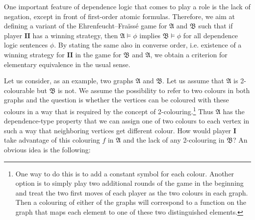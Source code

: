 \documentclass[12pt]{article}
\theoremstyle{definition}
\newcommand{\playerone}{\mathrm{\mathbf{I}}}
\newcommand{\playertwo}{\mathrm{\mathbf{II}}}
\newcommand{\A}{\mathfrak{A}}
\newcommand{\B}{\mathfrak{B}}
\def\ma{\A}
\def\mb{\B}
\begin{document}
One important feature of dependence logic that comes to play a role is the lack of negation, except in front of first-order atomic formulas. Therefore, we aim at defining a variant of the Ehrenfeucht--Fraïssé game for $\ma$ and $\mb$ such that if player $\playertwo$ has a winning strategy, then $\ma\models\phi$ implies $\mb\models\phi$ for all dependence logic sentences $\phi$. By stating the same also in converse order, i.e. existence of a winning strategy for $\playertwo$ in the game for $\mb$ and $\ma$, we obtain a criterion for elementary equivalence in the usual sense.

Let us consider, as an example,  two graphs $\ma$ and $\mb$. Let us assume that $\ma$ is 2-colourable but $\mb$ is  not. We assume the possibility to refer to two colours in both graphs and the question is whether the vertices can be coloured with these colours in a way that is required by the concept of 2-colouring.\footnote{One way to do this is to add a constant symbol for each colour. Another option is to simply play two additional rounds of the game in the beginning and treat the two first moves of each player as the two colours in each graph. Then a colouring of either of the graphs will correspond to a function on the graph that maps each element to one of these two distinguished elements.} Thus $\ma$ has the dependence-type property that we can assign one of two colours to each vertex in such a way that neighboring vertices get different colour. How would player $\playerone$ take advantage of this colouring $f$ in $\ma$ and the lack of any 2-colouring in $\mb$? An obvious idea is the following:
\end{document}
